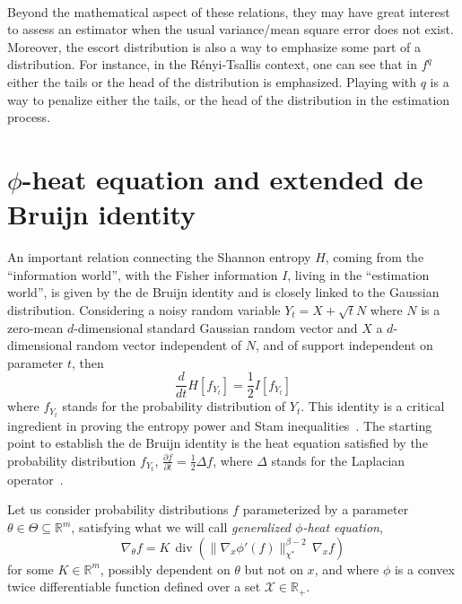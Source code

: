 \documentclass[entropy,article,submit,moreauthors,pdftex]{Definitions/mdpi}
\def\Rset{\mathbb{R}}%
\def\X{\mathcal{X}}%
\def\div{\operatorname{div}}%
\begin{document}
\

Beyond the mathematical aspect of these  relations, they may have great interest
to  assess an  estimator  when the  usual variance/mean  square  error does  not
exist. Moreover, the escort distribution is also a way to emphasize some part of
a distribution. For  instance, in the R\'enyi-Tsallis context, one  can see that
in $f^q$ either the tails or the head of the distribution is emphasized. Playing
with $q$ is a way to penalize either  the tails, or the head of the distribution
in the estimation process.




\section{$\phi$-heat equation and extended de Bruijn identity}
\label{sec:deBruijn}

An  important relation  connecting  the  Shannon entropy  $H$,  coming from  the
``information  world'',  with   the  Fisher  information  $I$,   living  in  the
``estimation world'', is  given by the de Bruijn identity  and is closely linked
to the  Gaussian distribution. Considering  a noisy random  variable $Y_t =  X +
\sqrt{t} N$  where $N$ is  a zero-mean $d$-dimensional standard  Gaussian random
vector  and $X$  a  $d$-dimensional random  vector independent  of  $N$, and  of
support independent on  parameter $t$, then $$\frac{d}{dt}  H[f_{Y_t}] = \frac12
I[f_{Y_t}]$$ where $f_{Y_t}$  stands for the probability  distribution of $Y_t$.
This identity  is a critical  ingredient in proving  the entropy power  and Stam
inequalities~\cite{CovTho06}.   The starting  point to  establish the  de Bruijn
identity  is  the  heat  equation  satisfied  by  the  probability  distribution
$f_{Y_t}$, $\frac{\partial  f}{\partial t} =  \frac12 \Delta f$,  where $\Delta$
stands for the Laplacian operator~\cite{Wid75}.


Let  us consider  probability  distributions $f$  parameterized  by a  parameter
$\theta  \in  \Theta \subseteq  \Rset^m$,  satisfying  what  we will  call  {\em
  generalized $\phi$-heat equation},
%
\begin{equation}
\label{eq:phi-heat_equation}
\nabla_\theta f = K \, \div\left( \| \nabla_x \phi'(f) \|_{\chi^*}^{\beta-2}
\, \nabla_x f \right)
\end{equation}
%
for some  $K \in \Rset^m$,  possibly dependent on $\theta$  but not on  $x$, and
where $\phi$  is a convex twice  differentiable function defined over  a set $\X
\in \Rset_+$.
\end{document}
